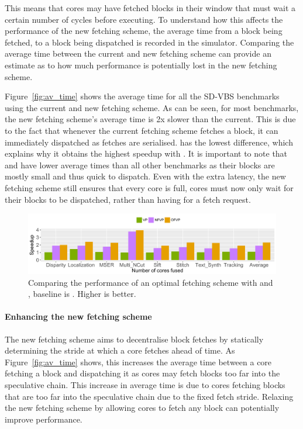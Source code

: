 This means that cores may have fetched blocks in their window that must wait a certain number of cycles before executing.
To understand how this affects the performance of the new fetching scheme, the average time from a block being fetched, to a block being dispatched is recorded in the simulator.
Comparing the average time between the current and new fetching scheme can provide an estimate as to how much performance is potentially lost in the new fetching scheme.

Figure~\ref{fig:av_time} shows the average time for all the SD-VBS benchmarks using the current and new fetching scheme.
As can be seen, for most benchmarks, the new fetching scheme's average time is 2x slower than the current.
This is due to the fact that whenever the current fetching scheme fetches a block, it can immediately dispatched as fetches are serialised.
 has the lowest difference, which explains why it obtains the highest speedup with \nfnovp{}.
It is important to note that  and  have lower average times than all other benchmarks as their blocks are mostly small and thus quick to dispatch.
Even with the extra latency, the new fetching scheme still ensures that every core is full, cores must now only wait for their blocks to be dispatched, rather than having for a fetch request.


\begin{figure}[t]
    \centering
    \includegraphics[width=1\textwidth]{chapter3/graphics/opt_res.pdf}
    \caption{Comparing the performance of an optimal fetching scheme with \vp{} and \nfvp{}, baseline is \novp. Higher is better.}
    \label{fig:opt_scheme}
	\vspace{1em}
\end{figure}

\paragraph*{Enhancing the new fetching scheme}

The new fetching scheme aims to decentralise block fetches by statically determining the stride at which a core fetches ahead of time.
As Figure~\ref{fig:av_time} shows, this increases the average time between a core fetching a block and dispatching it as cores may fetch blocks too far into the speculative chain.
This increase in average time is due to cores fetching blocks that are too far into the speculative chain due to the fixed fetch stride.
Relaxing the new fetching scheme by allowing cores to fetch any block can potentially improve performance.

